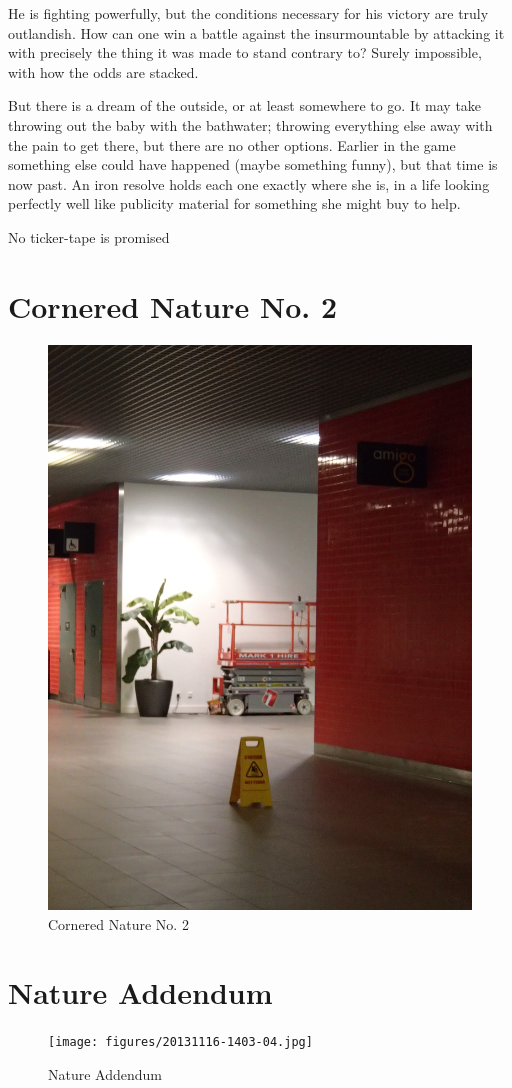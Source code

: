 \documentclass{book}
\begin{document}
He is fighting powerfully, but the conditions necessary for his victory are
truly outlandish. How can one win a battle against the insurmountable by
attacking it with precisely the thing it was made to stand contrary to? Surely
impossible, with how the odds are stacked.

But there is a dream of the outside, or at least somewhere to go. It may take
throwing out the baby with the bathwater; throwing everything else away with
the pain to get there, but there are no other options. Earlier in the game
something else could have happened (maybe something funny), but that time is
now past. An iron resolve holds each one exactly where she is, in a life
looking perfectly well like publicity material for something she might buy to
help.

No ticker-tape is promised

\chapter{Cornered Nature No. 2}

\begin{figure}
\centering
\includegraphics[width=\textwidth,angle=-90]{figures/P1050158.JPG}
\caption{Cornered Nature No. 2}
\end{figure}

\chapter{Nature Addendum}

\begin{figure}
\centering
\texttt{[image: figures/20131116-1403-04.jpg]}
\caption{Nature Addendum}
\end{figure}
\end{document}
